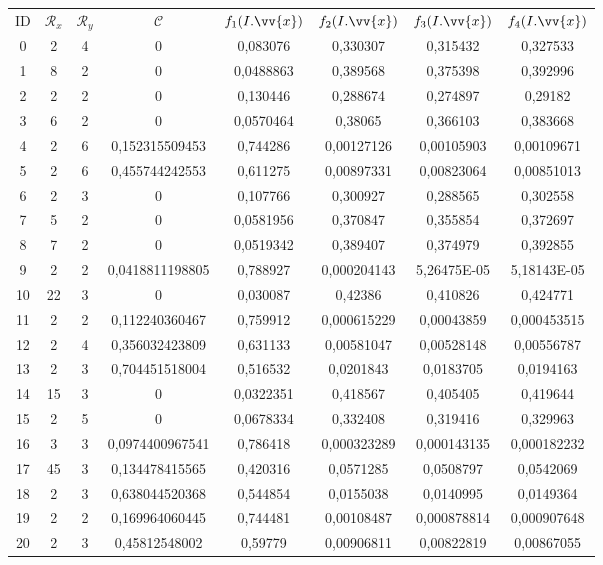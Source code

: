 \scriptsize
\begin{longtable}{|c|c|c|c|c|c|c|c|}
\hline
ID & $\mathscr{R}_x$ & $\mathscr{R}_y$ & $\mathscr{C}$ & $f_1(I.\vv{x})$ & $f_2(I.\vv{x})$ & $f_3(I.\vv{x})$ & $f_4(I.\vv{x})$ \\
0 & 2 & 4 & 0 & 0,083076 & 0,330307 & 0,315432 & 0,327533  \\
1 & 8 & 2 & 0 & 0,0488863 & 0,389568 & 0,375398 & 0,392996  \\
2 & 2 & 2 & 0 & 0,130446 & 0,288674 & 0,274897 & 0,29182  \\
3 & 6 & 2 & 0 & 0,0570464 & 0,38065 & 0,366103 & 0,383668  \\
4 & 2 & 6 & 0,152315509453 & 0,744286 & 0,00127126 & 0,00105903 & 0,00109671  \\
5 & 2 & 6 & 0,455744242553 & 0,611275 & 0,00897331 & 0,00823064 & 0,00851013  \\
6 & 2 & 3 & 0 & 0,107766 & 0,300927 & 0,288565 & 0,302558  \\
7 & 5 & 2 & 0 & 0,0581956 & 0,370847 & 0,355854 & 0,372697  \\
8 & 7 & 2 & 0 & 0,0519342 & 0,389407 & 0,374979 & 0,392855  \\
9 & 2 & 2 & 0,0418811198805 & 0,788927 & 0,000204143 & 5,26475E-05 & 5,18143E-05  \\
10 & 22 & 3 & 0 & 0,030087 & 0,42386 & 0,410826 & 0,424771  \\
11 & 2 & 2 & 0,112240360467 & 0,759912 & 0,000615229 & 0,00043859 & 0,000453515  \\
12 & 2 & 4 & 0,356032423809 & 0,631133 & 0,00581047 & 0,00528148 & 0,00556787  \\
13 & 2 & 3 & 0,704451518004 & 0,516532 & 0,0201843 & 0,0183705 & 0,0194163  \\
14 & 15 & 3 & 0 & 0,0322351 & 0,418567 & 0,405405 & 0,419644  \\
15 & 2 & 5 & 0 & 0,0678334 & 0,332408 & 0,319416 & 0,329963  \\
16 & 3 & 3 & 0,0974400967541 & 0,786418 & 0,000323289 & 0,000143135 & 0,000182232  \\
17 & 45 & 3 & 0,134478415565 & 0,420316 & 0,0571285 & 0,0508797 & 0,0542069  \\
18 & 2 & 3 & 0,638044520368 & 0,544854 & 0,0155038 & 0,0140995 & 0,0149364  \\
19 & 2 & 2 & 0,169964060445 & 0,744481 & 0,00108487 & 0,000878814 & 0,000907648  \\
20 & 2 & 3 & 0,45812548002 & 0,59779 & 0,00906811 & 0,00822819 & 0,00867055  \\

\end{longtable}
